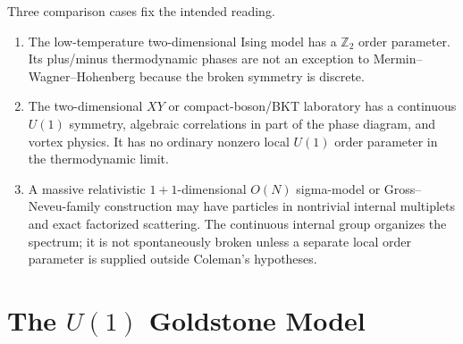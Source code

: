Three comparison cases fix the intended reading.
\begin{enumerate}
  \item The low-temperature two-dimensional Ising model has a
  \(\mathbb Z_2\) order parameter.  Its plus/minus thermodynamic phases are
  not an exception to Mermin--Wagner--Hohenberg because the broken symmetry is
  discrete.
  \item The two-dimensional \(XY\) or compact-boson/BKT laboratory has a
  continuous \(U(1)\) symmetry, algebraic correlations in part of the phase
  diagram, and vortex physics.  It has no ordinary nonzero local \(U(1)\)
  order parameter in the thermodynamic limit.
  \item A massive relativistic \(1+1\)-dimensional \(O(N)\) sigma-model or
  Gross--Neveu-family construction may have particles in nontrivial internal
  multiplets and exact factorized scattering.  The continuous internal group
  organizes the spectrum; it is not spontaneously broken unless a separate
  local order parameter is supplied outside Coleman's hypotheses.
\end{enumerate}

\section{The \texorpdfstring{\(U(1)\)}{U(1)} Goldstone Model}

